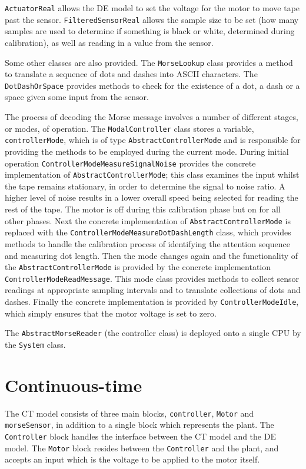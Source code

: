 \texttt{ActuatorReal} allows the DE model to set the voltage for the
motor to move tape past the sensor.  \texttt{FilteredSensorReal}
allows the sample size to be set (how many samples are used to
determine if something is black or white, determined during
calibration), as well as reading in a value from the sensor.

Some other classes are also provided.  The \texttt{MorseLookup} class
provides a method to translate a sequence of dots and dashes into
ASCII characters.  The \texttt{DotDashOrSpace} provides methods to
check for the existence of a dot, a dash or a space given some input
from the sensor.

The process of decoding the Morse message involves a number of
different stages, or modes, of operation.  The
\texttt{ModalController} class stores a variable,
\texttt{controllerMode}, which is of type
\texttt{AbstractControllerMode} and is responsible for providing the
methods to be employed during the current mode.  During initial
operation \texttt{ControllerModeMeasureSignalNoise} provides the
concrete implementation of \texttt{AbstractControllerMode}; this class
examines the input whilst the tape remains stationary, in order to
determine the signal to noise ratio.  A higher level of noise results
in a lower overall speed being selected for reading the rest of the
tape.  The motor is off during this calibration phase but on for all
other phases.  Next the concrete implementation of
\texttt{AbstractControllerMode} is replaced with the
\texttt{ControllerModeMeasureDotDash\-Length} class, which provides
methods to handle the calibration process of identifying the attention
sequence and measuring dot length.  Then the mode changes again and
the functionality of the \texttt{AbstractControllerMode} is provided
by the concrete implementation \texttt{ControllerMode\-ReadMessage}.
This mode class provides methods to collect sensor readings at
appropriate sampling intervals and to translate collections of dots
and dashes.  Finally the concrete implementation is provided by
\texttt{ControllerModeIdle}, which simply ensures that the motor
voltage is set to zero.

The \texttt{AbstractMorseReader} (the controller class) is deployed
onto a single CPU by the \texttt{System} class.

\section{Continuous-time} 
The CT model consists of three main blocks, \texttt{controller},
\texttt{Motor} and \texttt{morseSensor}, in addition to a single block
which represents the plant. The \texttt{Controller} block handles the
interface between the CT model and the DE model. The \texttt{Motor}
block resides between the \texttt{Controller} and the plant, and
accepts an input which is the voltage to be applied to the motor
itself.

